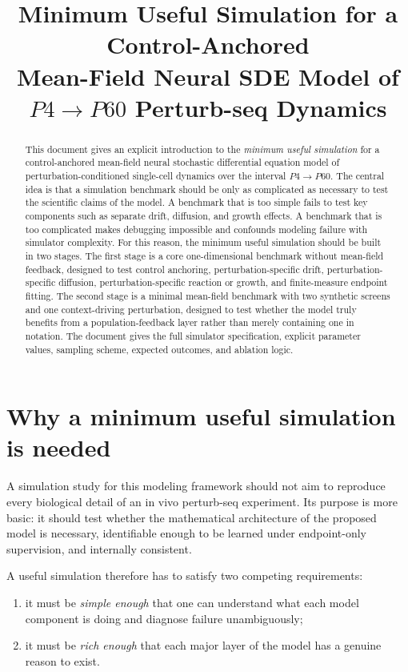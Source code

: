 \documentclass[11pt]{article}
\title{Minimum Useful Simulation for a Control-Anchored\\Mean-Field Neural SDE Model of $P4 \to P60$ Perturb-seq Dynamics}
\author{}
\date{}
\begin{document}
\maketitle

\begin{abstract}
This document gives an explicit introduction to the \emph{minimum useful simulation} for a control-anchored mean-field neural stochastic differential equation model of perturbation-conditioned single-cell dynamics over the interval $P4 \to P60$. The central idea is that a simulation benchmark should be only as complicated as necessary to test the scientific claims of the model. A benchmark that is too simple fails to test key components such as separate drift, diffusion, and growth effects. A benchmark that is too complicated makes debugging impossible and confounds modeling failure with simulator complexity. For this reason, the minimum useful simulation should be built in two stages. The first stage is a core one-dimensional benchmark without mean-field feedback, designed to test control anchoring, perturbation-specific drift, perturbation-specific diffusion, perturbation-specific reaction or growth, and finite-measure endpoint fitting. The second stage is a minimal mean-field benchmark with two synthetic screens and one context-driving perturbation, designed to test whether the model truly benefits from a population-feedback layer rather than merely containing one in notation. The document gives the full simulator specification, explicit parameter values, sampling scheme, expected outcomes, and ablation logic.
\end{abstract}

\tableofcontents

\section{Why a minimum useful simulation is needed}

A simulation study for this modeling framework should not aim to reproduce every biological detail of an in vivo perturb-seq experiment. Its purpose is more basic: it should test whether the mathematical architecture of the proposed model is necessary, identifiable enough to be learned under endpoint-only supervision, and internally consistent.

A useful simulation therefore has to satisfy two competing requirements:
\begin{enumerate}[label=(\roman*),leftmargin=2.2em]
    \item it must be \emph{simple enough} that one can understand what each model component is doing and diagnose failure unambiguously;
    \item it must be \emph{rich enough} that each major layer of the model has a genuine reason to exist.
\end{enumerate}
\end{document}
